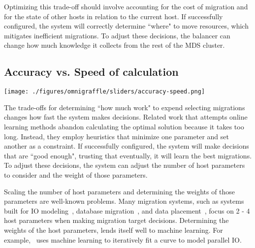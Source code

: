 Optimizing this trade-off should involve accounting for the cost of migration and for the state of other hosts in relation to the current host. If successfully configured, the system will correctly determine ``where" to move resources, which mitigates inefficient migrations. To adjust these decisions, the balancer can change how much knowledge it collects from the rest of the MDS cluster.


\subsection{Accuracy vs. Speed of calculation}
\begin{minipage}{0.8\textwidth}
	\texttt{[image: ./figures/omnigraffle/sliders/accuracy-speed.png]} 
	\vspace{0.2in}
\end{minipage}

The trade-offs for determining ``how much work" to expend selecting migrations changes how fast the system makes decisions. Related work that attempts online learning methods abandon calculating the optimal solution because it takes too long. Instead, they employ heuristics that minimize one parameter and set another as a constraint. If successfully configured, the system will make decisions that are ``good enough", trusting that eventually, it will learn the best migrations. To adjust these decisions, the system can adjust the number of host parameters to consider and the weight of those parameters. 

Scaling the number of host parameters and determining the weights of those parameters are well-known problems. Many migration systems, such as systems built for IO modeling~\cite{behzad:techreport2014-io-autotuning}, database migration~\cite{elmore:sigmod2013-pythia}, and data placement~\cite{strong:2014techreport-jack}, focus on 2 - 4 host parameters when making migration target decisions. Determining the weights of the host parameters, lends itself well to machine learning. For example,~\cite{behzad:techreport2014-io-autotuning} uses machine learning to iteratively fit a curve to model parallel IO. 

